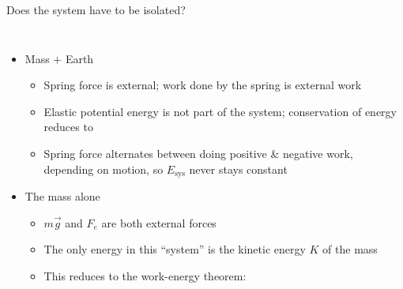 \documentclass[12pt,compress,aspectratio=169]{beamer}
\begin{document}
\begin{frame}[t]{Does the system have to be isolated?}
  \begin{columns}[T]
    \centering

    \begin{itemize}
    \item Mass + Earth
      \begin{itemize}
      \item Spring force is external; {\color{magenta}work done by
        the spring} is external work
      \item Elastic potential energy is not part of the system; conservation of
        energy reduces to


      \item\vspace{-.15in}Spring force alternates between doing positive \&
        negative work, depending on motion, so $E_\text{sys}$ never stays
        constant
      \end{itemize}
    \item The mass alone
      \begin{itemize}
      \item $m\vec g$ and $F_e$ are both external forces
      \item The only energy in this ``system'' is the kinetic energy $K$ of the
        mass
      \item This reduces to the work-energy theorem:

      \end{itemize}
    \end{itemize}
  \end{columns}
\end{frame}
\end{document}
